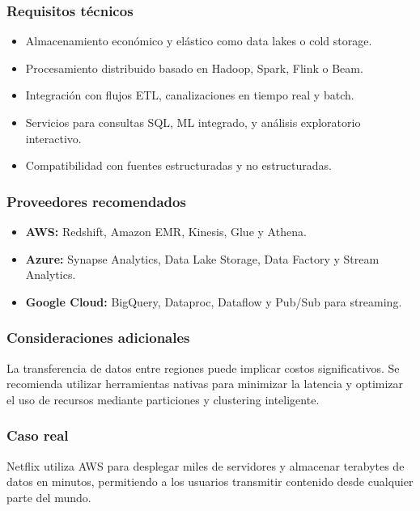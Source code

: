{            \subsubsection{Requisitos técnicos}
                \begin{itemize}
                    \item Almacenamiento económico y elástico como data lakes o cold storage.
                    \item Procesamiento distribuido basado en Hadoop, Spark, Flink o Beam.
                    \item Integración con flujos ETL, canalizaciones en tiempo real y batch.
                    \item Servicios para consultas SQL, ML integrado, y análisis exploratorio interactivo.
                    \item Compatibilidad con fuentes estructuradas y no estructuradas.
                \end{itemize}
                
            \subsubsection{Proveedores recomendados}
                \begin{itemize}
                    \item \textbf{AWS:} Redshift, Amazon EMR, Kinesis, Glue y Athena.
                    \item \textbf{Azure:} Synapse Analytics, Data Lake Storage, Data Factory y Stream Analytics.
                    \item \textbf{Google Cloud:} BigQuery, Dataproc, Dataflow y Pub/Sub para streaming.
                \end{itemize}
            
            \subsubsection{Consideraciones adicionales}
                La transferencia de datos entre regiones puede implicar costos significativos. Se recomienda utilizar herramientas nativas para minimizar la latencia y optimizar el uso de recursos mediante particiones y clustering inteligente.

            \subsubsection{Caso real}
                Netflix utiliza AWS para desplegar miles de servidores y almacenar terabytes de datos en minutos, permitiendo a los usuarios transmitir contenido desde cualquier parte del mundo.

}
